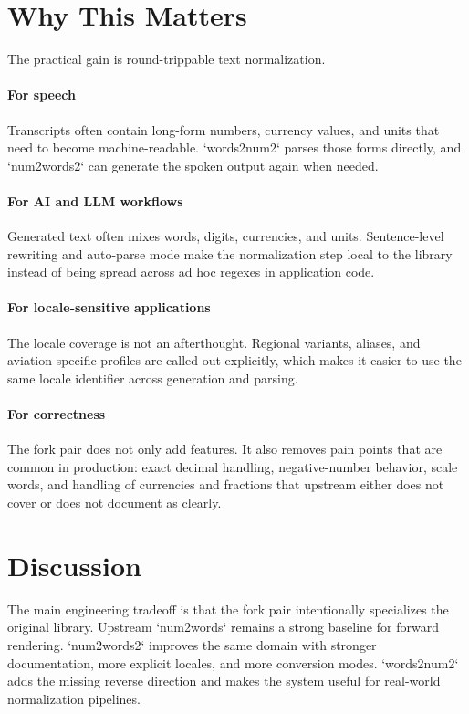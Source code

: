 \documentclass{article}
\begin{document}
\section{Why This Matters}
The practical gain is round-trippable text normalization.

\paragraph{For speech}
Transcripts often contain long-form numbers, currency values, and units that
need to become machine-readable. `words2num2` parses those forms directly, and
`num2words2` can generate the spoken output again when needed.

\paragraph{For AI and LLM workflows}
Generated text often mixes words, digits, currencies, and units. Sentence-level
rewriting and auto-parse mode make the normalization step local to the library
instead of being spread across ad hoc regexes in application code.

\paragraph{For locale-sensitive applications}
The locale coverage is not an afterthought. Regional variants, aliases, and
aviation-specific profiles are called out explicitly, which makes it easier to
use the same locale identifier across generation and parsing.

\paragraph{For correctness}
The fork pair does not only add features. It also removes pain points that are
common in production: exact decimal handling, negative-number behavior, scale
words, and handling of currencies and fractions that upstream either does not
cover or does not document as clearly.

\section{Discussion}
The main engineering tradeoff is that the fork pair intentionally specializes
the original library. Upstream `num2words` remains a strong baseline for
forward rendering. `num2words2` improves the same domain with stronger
documentation, more explicit locales, and more conversion modes. `words2num2`
adds the missing reverse direction and makes the system useful for real-world
normalization pipelines.
\end{document}
